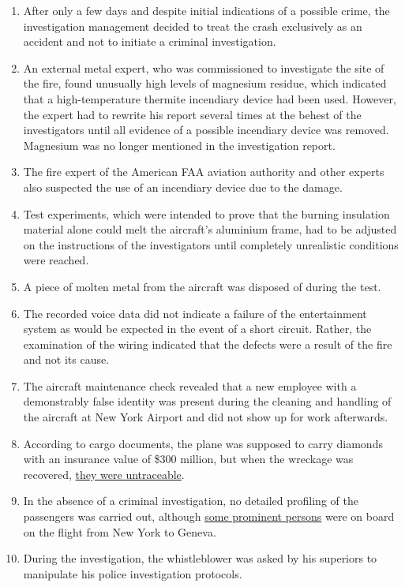 \begin{enumerate}
\def\labelenumi{\arabic{enumi}.}
\tightlist
\item
  After only a few days and despite initial indications of a possible
  crime, the investigation management decided to treat the crash
  exclusively as an accident and not to initiate a criminal
  investigation.
\item
  An external metal expert, who was commissioned to investigate the site
  of the fire, found unusually high levels of magnesium residue, which
  indicated that a high-temperature thermite incendiary device had been
  used. However, the expert had to rewrite his report several times at
  the behest of the investigators until all evidence of a possible
  incendiary device was removed. Magnesium was no longer mentioned in
  the investigation report.
\item
  The fire expert of the American FAA aviation authority and other
  experts also suspected the use of an incendiary device due to the
  damage.
\item
  Test experiments, which were intended to prove that the burning
  insulation material alone could melt the aircraft's aluminium frame,
  had to be adjusted on the instructions of the investigators until
  completely unrealistic conditions were reached.
\item
  A piece of molten metal from the aircraft was disposed of during the
  test.
\item
  The recorded voice data did not indicate a failure of the
  entertainment system as would be expected in the event of a short
  circuit. Rather, the examination of the wiring indicated that the
  defects were a result of the fire and not its cause.
\item
  The aircraft maintenance check revealed that a new employee with a
  demonstrably false identity was present during the cleaning and
  handling of the aircraft at New York Airport and did not show up for
  work afterwards.
\item
  According to cargo documents, the plane was supposed to carry diamonds
  with an insurance value of \$300 million, but when the wreckage was
  recovered,
  \href{https://www.cbc.ca/news/canada/the-mystery-of-swissair-flight-111-s-diamond-cargo-1.1051965}{they
  were untraceable}.
\item
  In the absence of a criminal investigation, no detailed profiling of
  the passengers was carried out, although
  \href{https://www.cbc.ca/news/canada/swissair-crash-may-not-have-been-an-accident-ex-rcmp-1.1019738}{some
  prominent persons} were on board on the flight from New York to
  Geneva.
\item
  During the investigation, the whistleblower was asked by his superiors
  to manipulate his police investigation protocols.
\end{enumerate}

